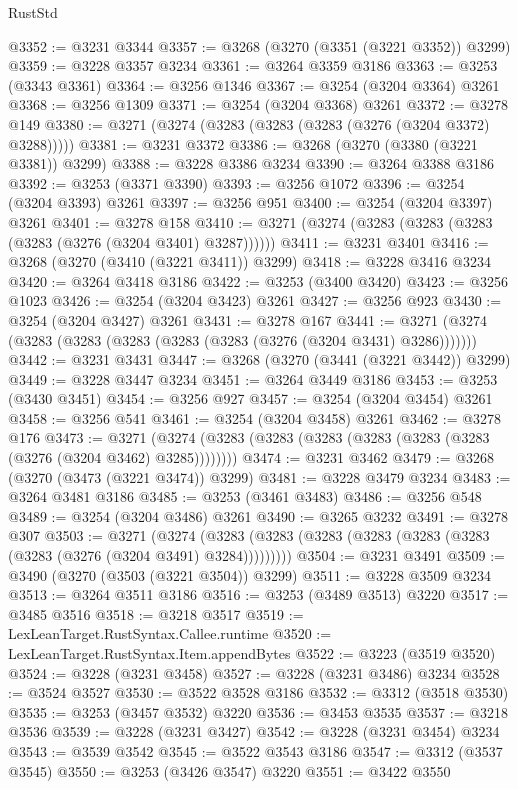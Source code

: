 \begin{lexlean}{RustStd}
\begin{coremodule}
@3352 := @3231 @3344
@3357 := @3268 (@3270 (@3351 (@3221 @3352)) @3299)
@3359 := @3228 @3357 @3234
@3361 := @3264 @3359 @3186
@3363 := @3253 (@3343 @3361)
@3364 := @3256 @1346
@3367 := @3254 (@3204 @3364) @3261
@3368 := @3256 @1309
@3371 := @3254 (@3204 @3368) @3261
@3372 := @3278 @149
@3380 := @3271 (@3274 (@3283 (@3283 (@3283 (@3276 (@3204 @3372) @3288)))))
@3381 := @3231 @3372
@3386 := @3268 (@3270 (@3380 (@3221 @3381)) @3299)
@3388 := @3228 @3386 @3234
@3390 := @3264 @3388 @3186
@3392 := @3253 (@3371 @3390)
@3393 := @3256 @1072
@3396 := @3254 (@3204 @3393) @3261
@3397 := @3256 @951
@3400 := @3254 (@3204 @3397) @3261
@3401 := @3278 @158
@3410 := @3271 (@3274 (@3283 (@3283 (@3283 (@3283 (@3276 (@3204 @3401) @3287))))))
@3411 := @3231 @3401
@3416 := @3268 (@3270 (@3410 (@3221 @3411)) @3299)
@3418 := @3228 @3416 @3234
@3420 := @3264 @3418 @3186
@3422 := @3253 (@3400 @3420)
@3423 := @3256 @1023
@3426 := @3254 (@3204 @3423) @3261
@3427 := @3256 @923
@3430 := @3254 (@3204 @3427) @3261
@3431 := @3278 @167
@3441 := @3271 (@3274 (@3283 (@3283 (@3283 (@3283 (@3283 (@3276 (@3204 @3431) @3286)))))))
@3442 := @3231 @3431
@3447 := @3268 (@3270 (@3441 (@3221 @3442)) @3299)
@3449 := @3228 @3447 @3234
@3451 := @3264 @3449 @3186
@3453 := @3253 (@3430 @3451)
@3454 := @3256 @927
@3457 := @3254 (@3204 @3454) @3261
@3458 := @3256 @541
@3461 := @3254 (@3204 @3458) @3261
@3462 := @3278 @176
@3473 := @3271 (@3274 (@3283 (@3283 (@3283 (@3283 (@3283 (@3283 (@3276 (@3204 @3462) @3285))))))))
@3474 := @3231 @3462
@3479 := @3268 (@3270 (@3473 (@3221 @3474)) @3299)
@3481 := @3228 @3479 @3234
@3483 := @3264 @3481 @3186
@3485 := @3253 (@3461 @3483)
@3486 := @3256 @548
@3489 := @3254 (@3204 @3486) @3261
@3490 := @3265 @3232
@3491 := @3278 @307
@3503 := @3271
    (@3274 (@3283 (@3283 (@3283 (@3283 (@3283 (@3283 (@3283 (@3276 (@3204 @3491) @3284)))))))))
@3504 := @3231 @3491
@3509 := @3490 (@3270 (@3503 (@3221 @3504)) @3299)
@3511 := @3228 @3509 @3234
@3513 := @3264 @3511 @3186
@3516 := @3253 (@3489 @3513) @3220
@3517 := @3485 @3516
@3518 := @3218 @3517
@3519 := LexLeanTarget.RustSyntax.Callee.runtime
@3520 := LexLeanTarget.RustSyntax.Item.appendBytes
@3522 := @3223 (@3519 @3520)
@3524 := @3228 (@3231 @3458)
@3527 := @3228 (@3231 @3486) @3234
@3528 := @3524 @3527
@3530 := @3522 @3528 @3186
@3532 := @3312 (@3518 @3530)
@3535 := @3253 (@3457 @3532) @3220
@3536 := @3453 @3535
@3537 := @3218 @3536
@3539 := @3228 (@3231 @3427)
@3542 := @3228 (@3231 @3454) @3234
@3543 := @3539 @3542
@3545 := @3522 @3543 @3186
@3547 := @3312 (@3537 @3545)
@3550 := @3253 (@3426 @3547) @3220
@3551 := @3422 @3550

\end{coremodule}
\end{lexlean}
